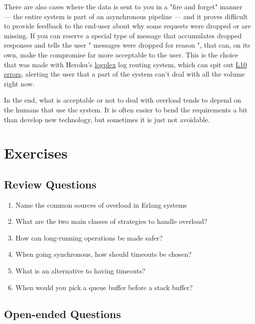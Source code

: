 There are also cases where the data is sent to you in a "fire and forget" manner — the entire system is part of an asynchronous pipeline — and it proves difficult to provide feedback to the end-user about why some requests were dropped or are missing. If you can reserve a special type of message that accumulates dropped responses and tells the user " messages were dropped for reason ", that can, on its own, make the compromise far more acceptable to the user. This is the choice that was made with Heroku's \href{https://devcenter.heroku.com/articles/logplex}{logplex} log routing system, which can spit out \href{https://devcenter.heroku.com/articles/error-codes\#l10-drain-buffer-overflow}{L10 errors}, alerting the user that a part of the system can't deal with all the volume right now.

In the end, what is acceptable or not to deal with overload tends to depend on the humans that use the system. It is often easier to bend the requirements a bit than develop new technology, but sometimes it is just not avoidable.


\section{Exercises}

\subsection*{Review Questions}

\begin{enumerate}
	\item Name the common sources of overload in Erlang systems
	\item What are the two main classes of strategies to handle overload?
	\item How can long-running operations be made safer?
	\item When going synchronous, how should timeouts be chosen?
	\item What is an alternative to having timeouts?
	\item When would you pick a queue buffer before a stack buffer?
\end{enumerate}

\subsection*{Open-ended Questions}

